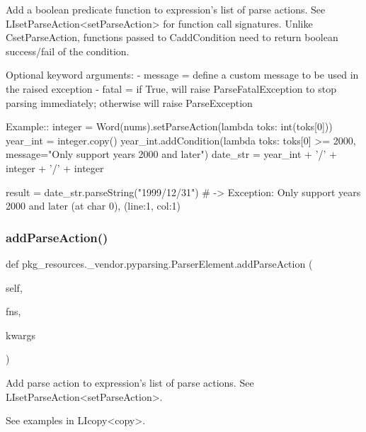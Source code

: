\begin{DoxyVerb}Add a boolean predicate function to expression's list of parse actions. See 
L{I{setParseAction}<setParseAction>} for function call signatures. Unlike C{setParseAction}, 
functions passed to C{addCondition} need to return boolean success/fail of the condition.

Optional keyword arguments:
 - message = define a custom message to be used in the raised exception
 - fatal   = if True, will raise ParseFatalException to stop parsing immediately; otherwise will raise ParseException
 
Example::
    integer = Word(nums).setParseAction(lambda toks: int(toks[0]))
    year_int = integer.copy()
    year_int.addCondition(lambda toks: toks[0] >= 2000, message="Only support years 2000 and later")
    date_str = year_int + '/' + integer + '/' + integer

    result = date_str.parseString("1999/12/31")  # -> Exception: Only support years 2000 and later (at char 0), (line:1, col:1)
\end{DoxyVerb}
 \mbox{\label{classpkg__resources_1_1__vendor_1_1pyparsing_1_1_parser_element_a21d9aab48590eca6709948628a4df8cd}} 
\subsubsection{\texorpdfstring{add\+Parse\+Action()}{addParseAction()}}
{\footnotesize\ttfamily def pkg\+\_\+resources.\+\_\+vendor.\+pyparsing.\+Parser\+Element.\+add\+Parse\+Action (\begin{DoxyParamCaption}\item[{}]{self,  }\item[{}]{fns,  }\item[{}]{kwargs }\end{DoxyParamCaption})}

\begin{DoxyVerb}Add parse action to expression's list of parse actions. See L{I{setParseAction}<setParseAction>}.

See examples in L{I{copy}<copy>}.
\end{DoxyVerb}
 \mbox{\label{classpkg__resources_1_1__vendor_1_1pyparsing_1_1_parser_element_a4bd956ef315744a6fda3bfa660121750}} 
